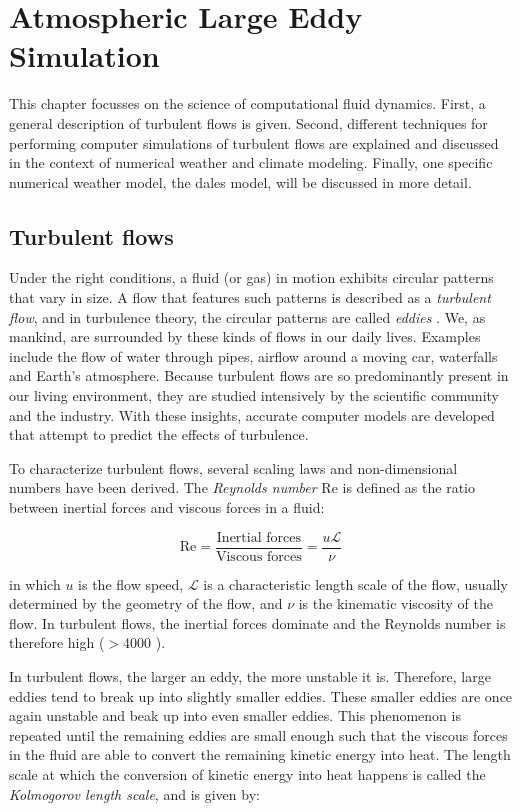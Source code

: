 \chapter{Atmospheric Large Eddy Simulation}
This chapter focusses on the science of computational fluid dynamics. First, a general description of turbulent flows is given. Second, different techniques for performing computer simulations of turbulent flows are explained and discussed in the context of numerical weather and climate modeling. Finally, one specific numerical weather model, the \acrfull{dales} model, will be discussed in more detail.

\section{Turbulent flows}
Under the right conditions, a fluid (or gas) in motion exhibits circular patterns that vary in size. A flow that features such patterns is described as a \emph{turbulent flow}, and in turbulence theory, the circular patterns are called \emph{eddies} \citep{popeTurbulentFlows2000}. We, as mankind, are surrounded by these kinds of flows in our daily lives. Examples include the flow of water through pipes, airflow around a moving car, waterfalls and Earth's atmosphere. Because turbulent flows are so predominantly present in our living environment, they are studied intensively by the scientific community and the industry. With these insights, accurate computer models are developed that attempt to predict the effects of turbulence.

To characterize turbulent flows, several scaling laws and non-dimensional numbers have been derived. The \emph{Reynolds number} $\text{Re}$ is defined as the ratio between inertial forces and viscous forces in a fluid: 

\begin{equation}
    \text{Re} = \frac{\text{Inertial forces}}{\text{Viscous forces}} = \frac{u \mathcal{L}}{\nu}
\end{equation}

in which $u$ is the flow speed, $\mathcal{L}$ is a characteristic length scale of the flow, usually determined by the geometry of the flow, and $\nu$ is the kinematic viscosity of the flow. In turbulent flows, the inertial forces dominate and the Reynolds number is therefore high ($>4000$ \citep{popeTurbulentFlows2000}). 

In turbulent flows, the larger an eddy, the more unstable it is. Therefore, large eddies tend to break up into slightly smaller eddies. These smaller eddies are once again unstable and beak up into even smaller eddies. This phenomenon is repeated until the remaining eddies are small enough such that the viscous forces in the fluid are able to convert the remaining kinetic energy into heat. The length scale at which the conversion of kinetic energy into heat happens is called the \emph{Kolmogorov length scale}, and is given by:

